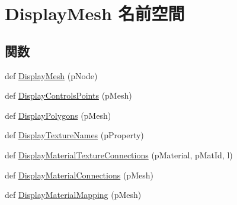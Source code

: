 \hypertarget{namespace_display_mesh}{}\section{Display\+Mesh 名前空間}
\label{namespace_display_mesh}
\subsection*{関数}
\begin{DoxyCompactItemize}
\item 
def \hyperlink{namespace_display_mesh_ad7aad925c6b08488410a66263097aa1f}{Display\+Mesh} (p\+Node)
\item 
def \hyperlink{namespace_display_mesh_aac1370c3bfef8f9354b2d6542de7a061}{Display\+Controls\+Points} (p\+Mesh)
\item 
def \hyperlink{namespace_display_mesh_a12110409bb6a31e9740575ed9606c56e}{Display\+Polygons} (p\+Mesh)
\item 
def \hyperlink{namespace_display_mesh_a8bf1b1ac655964fda10b9e6cf1c53689}{Display\+Texture\+Names} (p\+Property)
\item 
def \hyperlink{namespace_display_mesh_a7eb7ba12a47ad0cb8f08bd82eacbb280}{Display\+Material\+Texture\+Connections} (p\+Material, p\+Mat\+Id, l)
\item 
def \hyperlink{namespace_display_mesh_ae201819e291cbd72b316e3e9a9e3545a}{Display\+Material\+Connections} (p\+Mesh)
\item 
def \hyperlink{namespace_display_mesh_a0fe80bf2a361cb7762de06b812d0b7cb}{Display\+Material\+Mapping} (p\+Mesh)
\end{DoxyCompactItemize}



